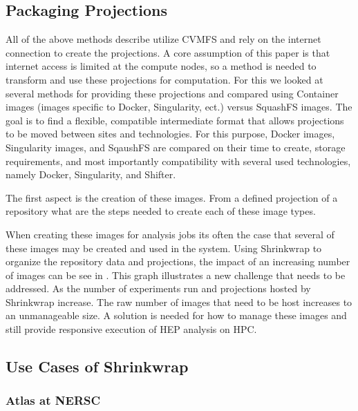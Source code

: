 \documentclass[sigconf]{acmart}
\begin{document}
\subsection{Packaging Projections}

All of the above methods describe utilize CVMFS
and rely on the internet connection to create
the projections.
A core assumption of this paper is that internet
access is limited at the compute nodes, so a method
is needed to transform and use these projections
for computation.
For this we looked at several methods for providing
these projections and compared using 
Container images (images specific to Docker, Singularity, ect.)
versus SquashFS images.
The goal is to find a flexible, compatible intermediate
format that allows projections to be moved between sites
and technologies.
For this purpose, Docker images, Singularity images, and 
SqaushFS are compared on their time to create,
storage requirements, and most importantly compatibility
with several used technologies, namely 
Docker, Singularity, and Shifter.

The first aspect is the creation of these images.
From a defined projection of a repository
what are the steps needed to create each of these image types.

When creating these images for analysis jobs its often the case that several
of these images may be created and used in the system.
Using Shrinkwrap to organize the repository data and projections,
the impact of an increasing number of images can be see in 
.
This graph illustrates a new challenge that needs to be addressed.
As the number of experiments run and projections hosted by Shrinkwrap
increase. 
The raw number of images that need to be host increases to an unmanageable
size.
A solution is needed for how to manage these images and still
provide responsive execution of HEP analysis on HPC.

\subsection{Use Cases of Shrinkwrap}

\subsubsection{Atlas at NERSC}
\end{document}
